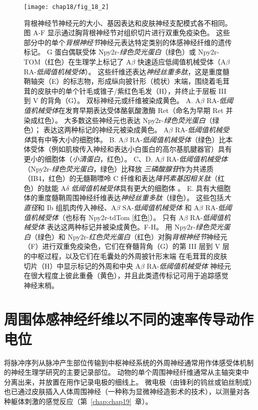 \begin{figure}[htbp]
	\centering
	\texttt{[image: chap18/fig\_18\_2]}
	\caption{背根神经节神经元的大小、基因表达和皮肤神经支配模式各不相同\cite{li2011functional}。
		图 A-F 显示通过胸背根神经节对组织切片进行双重免疫染色。
		这些部分中的单个\textit{背根神经节}神经元表达特定类别的体感神经纤维的遗传标记。
		G 蛋白偶联受体 Npy2r-\textit{绿色荧光蛋白}（绿色）或 Npy2r-TOM（红色）在生理学上标记了 A$\beta$ 快速适应低阈值机械受体（A$\beta$ RA-\textit{低阈值机械受体}）。
		这些纤维还表达\textit{神经丝重多肽}，这是重度髓鞘轴突（E）的标志物，形成纵向披针形（梳状）末端，围绕着毛茸茸的皮肤中的单个针毛或锥子/紫红色毛发（H），并终止于层板 III 到 V 的背角（G）。 
		双标神经元或纤维被染成黄色。
		A. A$\beta$ RA-\textit{低阈值机械受体}在发育早期表达受体酪氨酸激酶 Ret（命名为早期 Ret 并染成红色）。
		大多数这些神经元也表达 Npy2r-\textit{绿色荧光蛋白}（绿色）；
		表达这两种标记的神经元被染成黄色。 A$\beta$ RA-\textit{低阈值机械受体}具有中等大小的细胞体。
		B. A$\beta$ RA-\textit{低阈值机械受体}（绿色）比本体受体（例如肌梭传入神经和表达小白蛋白的高尔基肌腱器官）具有更小的细胞体（\textit{小清蛋白}，红色）。
		C、D. A$\beta$ RA-\textit{低阈值机械受体}（Npy2r-\textit{绿色荧光蛋白}，绿色）比释放 \textit{三磷酸腺苷}作为共递质（IB4，红色）的无髓鞘嘌呤 C 纤维和表达\textit{降钙素基因相关肽}（红色）的肽能 A$\delta$ \textit{低阈值机械受体}具有更大的细胞体 。
		E. 具有大细胞体的重度髓鞘周围神经纤维表达\textit{神经丝重多肽}（绿色）。
		这些包括\textit{大直径}和 Ib 组肌肉传入神经、A$\beta$ SA-\textit{低阈值机械受体} 和 A$\beta$ RA-\textit{低阈值机械受体}（也标有 Npy2r-tdTom [红色]）。
		只有 A$\beta$ RA-\textit{低阈值机械受体} 表达这两种标记并被染成黄色。F-H。
		用 Npy2r-\textit{绿色荧光蛋白}（绿色）和 Npy2r-\textit{红色荧光蛋白}（红色）对胸\textit{背根神经节}神经元（F）进行双重免疫染色，它们在脊髓背角（G）的第 III 层到 V 层的中枢过程，以及它们在毛囊处的外周披针形末端 在毛茸茸的皮肤切片（H）中显示标记的外周和中央 A$\beta$ RA-\textit{低阈值机械受体} 神经元在很大程度上彼此重叠（黄色），并且此类遗传标记可用于追踪感觉神经末梢。}
	\label{fig:18_2}
\end{figure}



\section{周围体感神经纤维以不同的速率传导动作电位}

将脉冲序列从脉冲产生部位传输到中枢神经系统的外周神经通常用作体感受体机制的神经生理学研究的主要记录部位。
动物的单个周围神经纤维通常从主轴突束中分离出来，并放置在用作记录电极的细线上。
微电极（由锋利的钨丝或铂丝制成）也已通过皮肤插入人体周围神经（一种称为显微神经造影术的技术），以测量对各种躯体刺激的感觉反应（第~\ref{chap:chap19}~章）。


